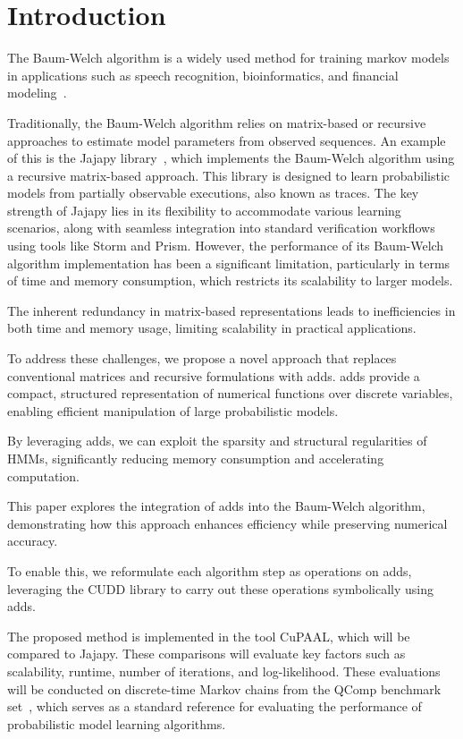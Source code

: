 
\section{Introduction}\label{sec:introduction}
The Baum-Welch algorithm is a widely used method for training markov models in applications such as speech recognition, bioinformatics, and financial modeling~\cite{chavan2013overview,ciocchetta2009bio,mamon2007hidden}.

Traditionally, the Baum-Welch algorithm relies on matrix-based or recursive approaches to estimate model parameters from observed sequences.
An example of this is the Jajapy library~\cite{ReynouardIB23}, which implements the Baum-Welch algorithm using a recursive matrix-based approach.
This library is designed to learn probabilistic models from partially observable executions, also known as traces.
The key strength of Jajapy lies in its flexibility to accommodate various learning scenarios, along with seamless integration into standard verification workflows using tools like Storm and Prism.
However, the performance of its Baum-Welch algorithm implementation has been a significant limitation, particularly in terms of time and memory consumption, which restricts its scalability to larger models.

The inherent redundancy in matrix-based representations leads to inefficiencies in both time and memory usage, limiting scalability in practical applications.

To address these challenges, we propose a novel approach that replaces conventional matrices and recursive formulations with \glspl{add}.
\glspl{add} provide a compact, structured representation of numerical functions over discrete variables, enabling efficient manipulation of large probabilistic models.

By leveraging \glspl{add}, we can exploit the sparsity and structural regularities of HMMs, significantly reducing memory consumption and accelerating computation.

This paper explores the integration of \glspl{add} into the Baum-Welch algorithm, demonstrating how this approach enhances efficiency while preserving numerical accuracy.

To enable this, we reformulate each algorithm step as operations on \glspl{add}, leveraging the CUDD library to carry out these operations symbolically using \glspl{add}.

The proposed method is implemented in the tool CuPAAL, which will be compared to Jajapy. These comparisons will evaluate key factors such as scalability, runtime, number of iterations, and log-likelihood.
These evaluations will be conducted on discrete-time Markov chains from the QComp benchmark set~\cite{HartmannsKPQR19}, which serves as a standard reference for evaluating the performance of probabilistic model learning algorithms.

